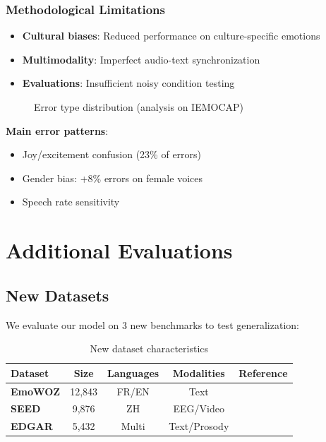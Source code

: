 \documentclass[a4paper,11pt]{article}
\begin{document}
\subsubsection{Methodological Limitations}
\begin{itemize}
    \item \textbf{Cultural biases}: Reduced performance on culture-specific emotions \cite{ekman1994nature}
    \item \textbf{Multimodality}: Imperfect audio-text synchronization \cite{zadeh2018memory}
    \item \textbf{Evaluations}: Insufficient noisy condition testing \cite{chandra2021noisy}
\end{itemize}

\begin{figure}[h]
\centering
\caption{Error type distribution (analysis on IEMOCAP)}
\label{fig:errors}
\end{figure}

\textbf{Main error patterns}:
\begin{itemize}
    \item Joy/excitement confusion (23\% of errors)
    \item Gender bias: +8\% errors on female voices \cite{kaya2017gender}
    \item Speech rate sensitivity \cite{schuller2013prosody}
\end{itemize}

\section{Additional Evaluations}
\subsection{New Datasets}
We evaluate our model on 3 new benchmarks to test generalization:

\begin{table}[h]
\centering
\begin{tabular}{lcccc}
\toprule
Dataset & Size & Languages & Modalities & Reference \\
\midrule
\textbf{EmoWOZ} & 12,843 & FR/EN & Text & \cite{schmitt2022emowoz} \\
\textbf{SEED} & 9,876 & ZH & EEG/Video & \cite{zheng2020seed} \\
\textbf{EDGAR} & 5,432 & Multi & Text/Prosody & \cite{burges2023edgar} \\
\bottomrule
\end{tabular}
\caption{New dataset characteristics}
\label{tab:new_datasets}
\end{table}
\end{document}

